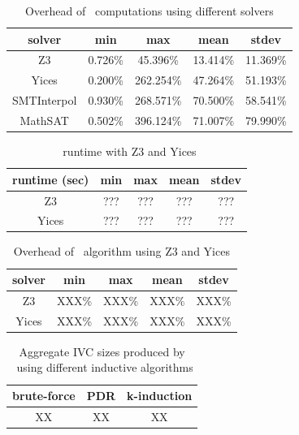 \begin{table}
  \centering
  \begin{tabular}{ |c||c|c|c|c| }
    \hline
     solver & min & max & mean & stdev \\[0.5ex]
    \hline
    Z3   & 0.726\% & 45.396\% & 13.414\% & 11.369\% \\[0.5ex]
    Yices &   0.200\%  & 262.254\%   & 47.264\% & 51.193\% \\[0.5ex]
    SMTInterpol& 0.930\% & 268.571\% &  70.500\% & 58.541\%\\[0.5ex]
    MathSAT & 0.502\% & 396.124\% &  71.007\% & 79.990\%\\[0.5ex]
    \hline
  \end{tabular}
  \caption{Overhead of \ucalg\ computations using different solvers}
  \label{tab:overhead-ucalg}
\end{table}

\begin{table}
  \centering
  \begin{tabular}{ |c||c|c|c|c| }
    \hline
     runtime (sec) & min & max & mean & stdev \\[0.5ex]
    \hline\hline
    Z3   & ??? & ??? & ??? & ??? \\[0.5ex]
    Yices &   ???  & ???   & ??? & ??? \\[0.5ex]
    \hline
  \end{tabular}
  \caption{\ucbfalg\ runtime with Z3 and Yices}
  \label{tab:runtime-ucbfalg}
\end{table}

\begin{table}
  \centering
  \begin{tabular}{ |c||c|c|c|c| }
    \hline
     solver & min & max & mean & stdev \\[0.5ex]
    \hline
    Z3   & XXX\% & XXX\% & XXX\% & XXX\% \\[0.5ex]
    Yices &   XXX\%  & XXX\%   & XXX\% & XXX\% \\[0.5ex]
    \hline
  \end{tabular}
  \caption{Overhead of \ucbfalg\ algorithm using Z3 and Yices}
  \label{tab:overhead-ucbfalg}
\end{table}


\begin{table}
  \centering
  \begin{tabular}{ |c|c|c| }
    \hline
     brute-force & PDR & k-induction \\
    \hline
      XX & XX & XX  \\
    \hline
  \end{tabular}
  \caption{Aggregate IVC sizes produced by \ucalg\ using different inductive algorithms}
  \label{tab:minimality-algorithm}
\end{table}

